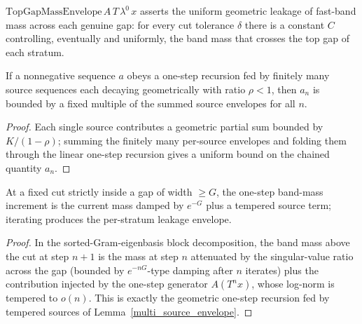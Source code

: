 \begin{definition}\label{TopGapMassEnvelope}
  \leanok
  \(\mathrm{TopGapMassEnvelope}\,A\,T\,\lambda^0\,x\) asserts the uniform geometric leakage of
  fast-band mass across each genuine gap: for every cut tolerance \(\delta\) there is a constant
  \(C\) controlling, eventually and uniformly, the band mass that crosses the top gap of each
  stratum.
\end{definition}

\begin{lemma}\label{multi_source_envelope}
  \leanok
  If a nonnegative sequence \(a\) obeys a one-step recursion fed by finitely many source sequences
  each decaying geometrically with ratio \(\rho<1\), then \(a_n\) is bounded by a fixed multiple of
  the summed source envelopes for all \(n\).
\end{lemma}
\begin{proof}\leanok
  Each single source contributes a geometric partial sum bounded by \(K/(1-\rho)\); summing the
  finitely many per-source envelopes and folding them through the linear one-step recursion gives a
  uniform bound on the chained quantity \(a_n\).
\end{proof}

\begin{lemma}\label{perStratumEnvelope_step}
  \leanok
  At a fixed cut strictly inside a gap of width \(\ge G\), the one-step band-mass increment is the
  current mass damped by \(e^{-G}\) plus a tempered source term; iterating produces the per-stratum
  leakage envelope.
\end{lemma}
\begin{proof}\leanok
  In the sorted-Gram-eigenbasis block decomposition, the band mass above the cut at step \(n+1\)
  is the mass at step \(n\) attenuated by the singular-value ratio across the gap (bounded by
  \(e^{-nG}\)-type damping after \(n\) iterates) plus the contribution injected by the one-step
  generator \(A(T^n x)\), whose log-norm is tempered to \(o(n)\). This is exactly the geometric
  one-step recursion fed by tempered sources of Lemma~\ref{multi_source_envelope}.
\end{proof}

